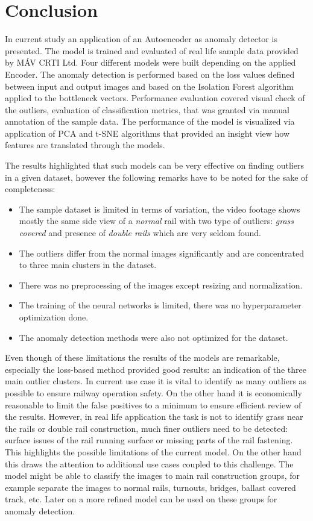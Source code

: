 \section{Conclusion} \label{conclusion}
In current study an application of an Autoencoder as anomaly detector is presented.
The model is trained and evaluated of real life sample data provided by MÁV CRTI Ltd.
Four different models were built depending on the applied Encoder.
The anomaly detection is performed based on the loss values defined between input
and output images and based on the Isolation Forest algorithm applied to the bottleneck
vectors.
Performance evaluation covered visual check of the outliers, evaluation of classification
metrics, that was granted via manual annotation of the sample data.
The performance of the model is visualized via application of PCA and t-SNE algorithms that
provided an insight view how features are translated through the models.

The results highlighted that such models can be very effective on finding outliers
in a given dataset, however the following remarks have to be noted for the sake of completeness:

\begin{itemize}
      \item The sample dataset is limited in terms of variation, the video footage shows
            mostly the same side view of a \emph{normal} rail with two type of outliers:
            \emph{grass covered} and presence of \emph{double rails} which are very seldom found.
      \item The outliers differ from the normal images significantly and are concentrated to
            three main clusters in the dataset.
      \item There was no preprocessing of the images except resizing and normalization.
      \item The training of the neural networks is limited, there was no hyperparameter
            optimization done.
      \item The anomaly detection methods were also not optimized for the dataset.
\end{itemize}

Even though of these limitations the results of the models are remarkable, especially the
loss-based method provided good results: an indication of the three main outlier clusters.
In current use case it is vital to identify as many outliers as possible to ensure railway
operation safety.
On the other hand it is economically reasonable to limit the false positives to a minimum
to ensure efficient review of the results.
However, in real life application the task is not to identify grass near the rails or double rail
construction, much finer outliers need to be detected: surface issues of the rail running surface
or missing parts of the rail fastening.
This highlights the possible limitations of the current model.
On the other hand this draws the attention to additional use cases coupled to this challenge.
The model might be able to classify the images to main rail construction groups, for example
separate the images to normal rails, turnouts, bridges, ballast covered track, etc.
Later on a more refined model can be used on these groups for anomaly detection.

